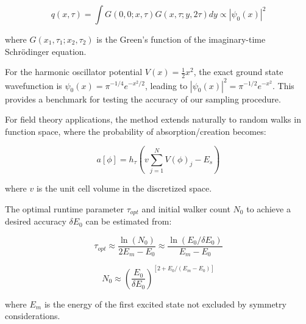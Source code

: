 \documentclass[reqno]{amsart}
\numberwithin{equation}{section}
\numberwithin{figure}{section}
\begin{document}
\begin{equation}
q(x,\tau) = \int G(0,0;x,\tau)G(x,\tau;y,2\tau)dy \propto |\psi_0(x)|^2
\end{equation}

where $G(x_1,\tau_1;x_2,\tau_2)$ is the Green's function of the imaginary-time Schrödinger equation.

For the harmonic oscillator potential $V(x) = \frac{1}{2}x^2$, the exact ground state wavefunction is $\psi_0(x) = \pi^{-1/4}e^{-x^2/2}$, leading to $|\psi_0(x)|^2 = \pi^{-1/2}e^{-x^2}$. This provides a benchmark for testing the accuracy of our sampling procedure.

For field theory applications, the method extends naturally to random walks in function space, where the probability of absorption/creation becomes:

\begin{equation}
a[\phi] = h_\tau\left(v \sum_{j=1}^{N} V(\phi)_j - E_s\right)
\end{equation}

where $v$ is the unit cell volume in the discretized space.

The optimal runtime parameter $\tau_{opt}$ and initial walker count $N_0$ to achieve a desired accuracy $\delta E_0$ can be estimated from:

\begin{equation}
\tau_{opt} \approx \frac{\ln(N_0)}{2E_m - E_0} \approx \frac{\ln(E_0/\delta E_0)}{E_m - E_0}
\end{equation}

\begin{equation}
N_0 \approx \left(\frac{E_0}{\delta E_0}\right)^{[2+E_0/(E_m-E_0)]}
\end{equation}

where $E_m$ is the energy of the first excited state not excluded by symmetry considerations.
\end{document}

